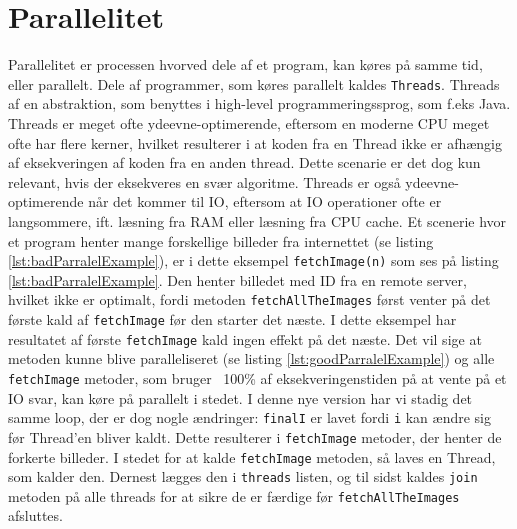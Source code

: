 \section{Parallelitet}\label{ch:parallelitet}
Parallelitet er processen hvorved dele af et program, kan køres på samme tid, eller parallelt. Dele af programmer, som køres parallelt kaldes \texttt{Threads}\cite{JavaThreads}. Threads af en abstraktion, som benyttes i high-level programmeringssprog, som f.eks Java\cite{HighLevel}. Threads er meget ofte ydeevne-optimerende, eftersom en moderne CPU meget ofte har flere kerner\cite{MultiCores}, hvilket resulterer i at koden fra en Thread ikke er afhængig af eksekveringen af koden fra en anden thread. Dette scenarie er det dog kun relevant, hvis der eksekveres en svær algoritme. Threads er også ydeevne-optimerende når det kommer til IO, eftersom at IO operationer ofte er langsommere, ift. læsning fra RAM eller læsning fra CPU cache\cite{OperatingSystems}. Et scenerie hvor et program henter mange forskellige billeder fra internettet (se listing \ref{lst:badParralelExample}), er i dette eksempel \texttt{fetchImage(n)} som ses på listing \ref{lst:badParralelExample}. Den henter billedet med ID fra en remote server, hvilket ikke er optimalt, fordi metoden \texttt{fetchAllTheImages} først venter på det første kald af \texttt{fetchImage} før den starter det næste. I dette eksempel har resultatet af første \texttt{fetchImage} kald ingen effekt på det næste. Det vil sige at metoden kunne blive paralleliseret (se listing \ref{lst:goodParralelExample}) og alle \texttt{fetchImage} metoder, som bruger ~100\% af eksekveringenstiden på at vente på et IO svar, kan køre på parallelt i stedet. I denne nye version har vi stadig det samme loop, der er dog nogle ændringer: \texttt{finalI} er lavet fordi \texttt{i} kan ændre sig før Thread'en bliver kaldt. Dette resulterer i \texttt{fetchImage} metoder, der henter de forkerte billeder. I stedet for at kalde \texttt{fetchImage} metoden, så laves en Thread, som kalder den. 
Dernest lægges den i \texttt{threads} listen, og til sidst kaldes \texttt{join} metoden på alle threads for at sikre de er færdige før \texttt{fetchAllTheImages} afsluttes.


